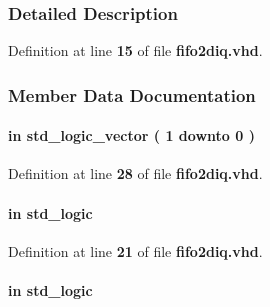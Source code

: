 \subsubsection{Detailed Description}


Definition at line {\bf 15} of file {\bf fifo2diq.\+vhd}.



\subsubsection{Member Data Documentation}
\paragraph[{ch\+\_\+en}]{ {\bfseries \textcolor{keywordflow}{in}\textcolor{vhdlchar}{ }} {\bfseries \textcolor{comment}{std\+\_\+logic\+\_\+vector}\textcolor{vhdlchar}{ }\textcolor{vhdlchar}{(}\textcolor{vhdlchar}{ }\textcolor{vhdlchar}{ } \textcolor{vhdldigit}{1} \textcolor{vhdlchar}{ }\textcolor{keywordflow}{downto}\textcolor{vhdlchar}{ }\textcolor{vhdlchar}{ } \textcolor{vhdldigit}{0} \textcolor{vhdlchar}{ }\textcolor{vhdlchar}{)}\textcolor{vhdlchar}{ }} \hspace{0.3cm}{\ttfamily [Port]}}\label{classfifo2diq_a6494f316f504075c4ccf47146756d576}


Definition at line {\bf 28} of file {\bf fifo2diq.\+vhd}.

\paragraph[{clk}]{ {\bfseries \textcolor{keywordflow}{in}\textcolor{vhdlchar}{ }} {\bfseries \textcolor{comment}{std\+\_\+logic}\textcolor{vhdlchar}{ }} \hspace{0.3cm}{\ttfamily [Port]}}\label{classfifo2diq_a4a4609c199d30b3adebbeb3a01276ec5}


Definition at line {\bf 21} of file {\bf fifo2diq.\+vhd}.

\paragraph[{ddr\+\_\+en}]{ {\bfseries \textcolor{keywordflow}{in}\textcolor{vhdlchar}{ }} {\bfseries \textcolor{comment}{std\+\_\+logic}\textcolor{vhdlchar}{ }} \hspace{0.3cm}{\ttfamily [Port]}}\label{classfifo2diq_adbfe05e6692f69f8e592df06c6055f0a}


